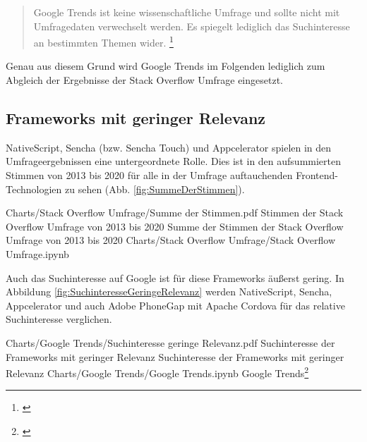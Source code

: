 \begin{quotation}
Google Trends ist keine wissenschaftliche Umfrage und sollte nicht mit Umfragedaten verwechselt werden.
Es spiegelt lediglich das Suchinteresse an bestimmten Themen wider.
\footnote{\cite{GoogleTrendsHilfe}}
\end{quotation}

Genau aus diesem Grund wird Google Trends im Folgenden lediglich zum Abgleich der Ergebnisse der Stack Overflow Umfrage eingesetzt.

\subsection{Frameworks mit geringer Relevanz}

NativeScript, Sencha (bzw.
Sencha Touch) und Appcelerator spielen in den Umfrageergebnissen eine untergeordnete Rolle.
Dies ist in den aufsummierten Stimmen von 2013 bis 2020 für alle in der Umfrage auftauchenden Frontend-Technologien zu sehen (Abb.
\ref{fig:SummeDerStimmen}).

\begin{alexfigurewithnotebook}{Charts/Stack Overflow Umfrage/Summe der Stimmen.pdf}
	{Stimmen der Stack Overflow Umfrage von 2013 bis 2020}
	{Summe der Stimmen der Stack Overflow Umfrage von 2013 bis 2020}
	{Charts/Stack Overflow Umfrage/Stack Overflow Umfrage.ipynb}
	{}

	\label{lst:Schritt1MassnahmenDeserialisierenOhneFehlerUnitTest}

\end{alexfigurewithnotebook}

Auch das Suchinteresse auf Google ist für diese Frameworks äußerst gering.
In Abbildung \ref{fig:SuchinteresseGeringeRelevanz} werden NativeScript, Sencha, Appcelerator und auch Adobe PhoneGap mit Apache Cordova für das relative Suchinteresse verglichen.

\begin{alexfigurewithnotebook}{Charts/Google Trends/Suchinteresse geringe Relevanz.pdf}
	{Suchinteresse der Frameworks mit geringer Relevanz}
	{Suchinteresse der Frameworks mit geringer Relevanz}
	{Charts/Google Trends/Google Trends.ipynb}
	{Google Trends\footnote{\cite{FaqPhoneGapDocs}}}
	\label{fig:SuchinteresseGeringeRelevanz}

\end{alexfigurewithnotebook}

